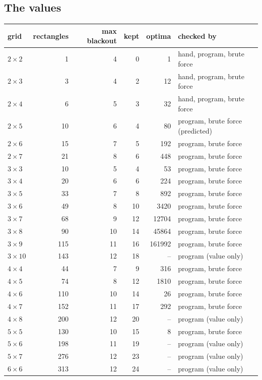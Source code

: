 \documentclass[11pt]{article}
\theoremstyle{definition}
\theoremstyle{remark}
\begin{document}
\subsection{The values}

\begin{center}\small
\begin{tabular}{lrrrrl}
\toprule
grid & rectangles & max blackout & kept & optima & checked by \\
\midrule
$2\times2$ & 1 & 4 & 0 & 1 & hand, program, brute force \\
$2\times3$ & 3 & 4 & 2 & 12 & hand, program, brute force \\
$2\times4$ & 6 & 5 & 3 & 32 & hand, program, brute force \\
$2\times5$ & 10 & 6 & 4 & 80 & program, brute force (predicted) \\
$2\times6$ & 15 & 7 & 5 & 192 & program, brute force \\
$2\times7$ & 21 & 8 & 6 & 448 & program, brute force \\
$3\times3$ & 10 & 5 & 4 & 53 & program, brute force \\
$3\times4$ & 20 & 6 & 6 & 224 & program, brute force \\
$3\times5$ & 33 & 7 & 8 & 892 & program, brute force \\
$3\times6$ & 49 & 8 & 10 & 3420 & program, brute force \\
$3\times7$ & 68 & 9 & 12 & 12704 & program, brute force \\
$3\times8$ & 90 & 10 & 14 & 45864 & program, brute force \\
$3\times9$ & 115 & 11 & 16 & 161992 & program, brute force \\
$3\times10$ & 143 & 12 & 18 & -- & program (value only) \\
$4\times4$ & 44 & 7 & 9 & 316 & program, brute force \\
$4\times5$ & 74 & 8 & 12 & 1810 & program, brute force \\
$4\times6$ & 110 & 10 & 14 & 26 & program, brute force \\
$4\times7$ & 152 & 11 & 17 & 292 & program, brute force \\
$4\times8$ & 200 & 12 & 20 & -- & program (value only) \\
$5\times5$ & 130 & 10 & 15 & 8 & program, brute force \\
$5\times6$ & 198 & 11 & 19 & -- & program (value only) \\
$5\times7$ & 276 & 12 & 23 & -- & program (value only) \\
$6\times6$ & 313 & 12 & 24 & -- & program (value only) \\
\bottomrule
\end{tabular}
\end{center}
\end{document}
